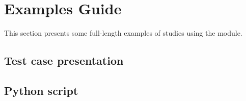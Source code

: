 



\section{Examples Guide}

This section presents some full-length examples of studies using the module.

\subsection{Test case presentation}


\subsection{Python script}

